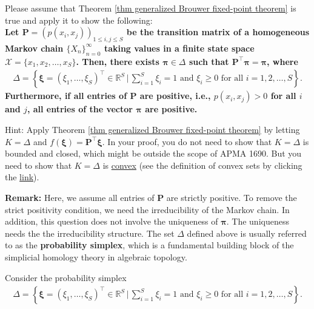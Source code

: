 \documentclass[11pt,letterpaper, leqno]{article}
\numberwithin{equation}{section}
\numberwithin{theorem}{section}
\numberwithin{lemma}{section}
\numberwithin{corollary}{section}
\numberwithin{definition}{section}
\numberwithin{proposition}{section}
\numberwithin{remark}{section}
\numberwithin{example}{section}
\newcommand{\T}{\intercal}
\begin{document}
\begin{enumerate}
    Please assume that Theorem \ref{thm generalized Brouwer fixed-point theorem} is true and apply it to show the following:\\ \textbf{Let $\boldsymbol{P}=\left(p(x_i, x_j)\right)_{1\le i,j\le S}$ be the transition matrix of a homogeneous Markov chain $\{X_n\}_{n=0}^\infty$ taking values in a finite state space $\mathcal{X}=\{x_1, x_2,\ldots, x_S\}$. Then, there exists $\boldsymbol{\pi}\in\Delta$ such that $\boldsymbol{P}^\T\boldsymbol{\pi}=\boldsymbol{\pi}$, where 
    \begin{align*}
        \Delta= \left\{\boldsymbol{\xi}=(\xi_1,\ldots,\xi_S)^\T\in\mathbb{R}^S\,\Bigg\vert\, \sum_{i=1}^S \xi_i=1 \mbox{ and }\xi_i\ge 0 \mbox{ for all }i=1,2,\ldots,S \right\}.
    \end{align*}
    Furthermore, if all entries of $\boldsymbol{P}$ are positive, i.e., $p(x_i, x_j)>0$ for all $i$ and $j$, all entries of the vector $\boldsymbol{\pi}$ are positive.}
    
    Hint: Apply Theorem \ref{thm generalized Brouwer fixed-point theorem} by letting $K=\Delta$ and $f(\boldsymbol{\xi})=\boldsymbol{P}^\T\boldsymbol{\xi}$. In your proof, you do not need to show that $K=\Delta$ is bounded and closed, which might be outside the scope of APMA 1690. But you need to show that $K=\Delta$ is \href{https://en.wikipedia.org/wiki/Convex_set}{convex} (see the definition of convex sets by clicking the \href{https://en.wikipedia.org/wiki/Convex_set}{link}). 

    \noindent\textbf{Remark:} Here, we assume all entries of $\boldsymbol{P}$ are strictly positive. To remove the strict positivity condition, we need the irreducibility of the Markov chain. In addition, this question does not involve the uniqueness of $\boldsymbol{\pi}$. The uniqueness needs the the irreducibility structure. The set $\Delta$ defined above is usually referred to as the \textbf{probability simplex}, which is a fundamental building block of the simplicial homology theory in algebraic topology. 

        \color{blue}
            Consider the probability simplex 
            \begin{align*}
                \Delta= \left\{\boldsymbol{\xi}=(\xi_1,\ldots,\xi_S)^\T\in\mathbb{R}^S\,\Bigg\vert\, \sum_{i=1}^S \xi_i=1 \mbox{ and }\xi_i\ge 0 \mbox{ for all }i=1,2,\ldots,S \right\}.
            \end{align*}


\end{enumerate}
\end{document}
